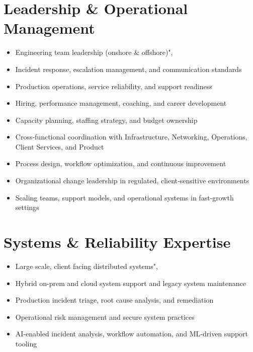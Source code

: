 \documentclass[12pt,letter]{article}
\begin{document}
\section*{Leadership \& Operational Management}
\begin{itemize}[noitemsep]
\item Engineering team leadership (onshore \& offshore)",
\item Incident response, escalation management, and communication standards
\item Production operations, service reliability, and support readiness
\item Hiring, performance management, coaching, and career development
\item Capacity planning, staffing strategy, and budget ownership
\item Cross‑functional coordination with Infrastructure, Networking, Operations, Client Services, and Product
\item Process design, workflow optimization, and continuous improvement
\item Organizational change leadership in regulated, client‑sensitive environments
\item Scaling teams, support models, and operational systems in fast‑growth settings
\end{itemize}
\section*{Systems \& Reliability Expertise}
\begin{itemize}[noitemsep]
\item Large scale, client facing distributed systems",
\item Hybrid on-prem and cloud system support and legacy system maintenance
\item Production incident triage, root cause analysis, and remediation
\item Operational risk management and secure system practices
\item AI‑enabled incident analysis, workflow automation, and ML‑driven support tooling
\end{itemize}
\end{document}

